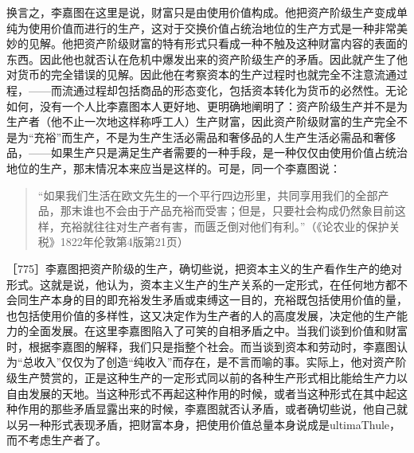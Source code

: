 换言之，李嘉图在这里是说，财富只是由使用价值构成。他把资产阶级生产变成单纯为使用价值而进行的生产，这对于交换价值占统治地位的生产方式是一种非常美妙的见解。他把资产阶级财富的特有形式只看成一种不触及这种财富内容的表面的东西。因此他也就否认在危机中爆发出来的资产阶级生产的矛盾。因此就产生了他对货币的完全错误的见解。因此他在考察资本的生产过程时也就完全不注意流通过程，——而流通过程却包括商品的形态变化，包括资本转化为货币的必然性。无论如何，没有一个人比李嘉图本人更好地、更明确地阐明了：资产阶级生产并不是为生产者（他不止一次地这样称呼工人）生产财富，因此资产阶级财富的生产完全不是为“充裕”而生产，不是为生产生活必需品和奢侈品的人生产生活必需品和奢侈品，——如果生产只是满足生产者需要的一种手段，是一种仅仅由使用价值占统治地位的生产，那末情况本来应当是这样的。可是，同一个李嘉图说：

\begin{quote}{“如果我们生活在欧文先生的一个平行四边形里，共同享用我们的全部产品，那末谁也不会由于产品充裕而受害；但是，只要社会构成仍然象目前这样，充裕就往往对生产者有害，而匮乏倒对他们有利。”（《论农业的保护关税》1822年伦敦第4版第21页）}\end{quote}

［775］李嘉图把资产阶级的生产，确切些说，把资本主义的生产看作生产的绝对形式。这就是说，他认为，资本主义生产的生产关系的一定形式，在任何地方都不会同生产本身的目的即充裕发生矛盾或束缚这一目的，充裕既包括使用价值的量，也包括使用价值的多样性，这又决定作为生产者的人的高度发展，决定他的生产能力的全面发展。在这里李嘉图陷入了可笑的自相矛盾之中。当我们谈到价值和财富时，根据李嘉图的解释，我们只是指整个社会。而当谈到资本和劳动时，李嘉图认为“总收入”仅仅为了创造“纯收入”而存在，是不言而喻的事。实际上，他对资产阶级生产赞赏的，正是这种生产的一定形式同以前的各种生产形式相比能给生产力以自由发展的天地。当这种形式不再起这种作用的时候，或者当这种形式在其中起这种作用的那些矛盾显露出来的时候，李嘉图就否认矛盾，或者确切些说，他自己就以另一种形式表现矛盾，把财富本身，把使用价值总量本身说成是ultimaThule，而不考虑生产者了。

